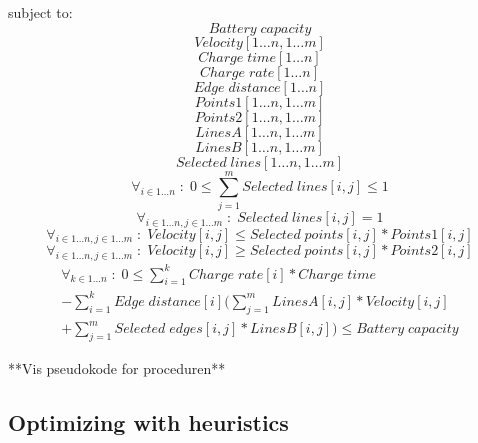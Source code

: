 subject to:
\begin{equation}
Battery\;capacity
\end{equation}
\begin{equation}
Velocity[1 \dots n,1 \dots m]
\end{equation}
\begin{equation}
Charge\;time[1 \dots n]
\end{equation}
\begin{equation}
Charge\;rate[1 \dots n]
\end{equation}
\begin{equation}
Edge\;distance[1 \dots n]
\end{equation}
\begin{equation}
Points1[1 \dots n,1 \dots m]
\end{equation}
\begin{equation}
Points2[1 \dots n,1 \dots m]
\end{equation}
\begin{equation}
LinesA[1 \dots n,1 \dots m]
\end{equation}
\begin{equation}
LinesB[1 \dots n,1 \dots m]
\end{equation}
\begin{equation}
Selected\;lines[1 \dots n,1 \dots m]
\end{equation}
\begin{equation}
\forall_{i\in1 \dots n }\;:\;0\le \sum_{j=1}^{m} Selected\;lines[i,j] \le 1
\end{equation}
\begin{equation}
\forall_{i\in1 \dots n, j \in 1 \dots m} \;:\; Selected\;lines[i,j] = 1
\end{equation}
\begin{equation}
\forall_{i\in1 \dots n, j \in 1 \dots m}\;:\;Velocity[i,j] \le Selected\;points[i,j] * Points1[i,j]
\end{equation}
\begin{equation}
\forall_{i\in1 \dots n, j \in 1 \dots m}\;:\;Velocity[i,j] \ge Selected\;points[i,j] * Points2[i,j]
\end{equation}
\begin{equation}
\begin{split}
\forall_{k\in1 \dots n}\;:\;0 \le\sum_{i=1}^{k}Charge\;rate[i]*Charge\;time\\
-\sum_{i=1}^{k} Edge\; distance[i](\sum_{j=1}^{m} LinesA[i,j]*Velocity[i,j]\\
+\sum_{j=1}^{m} Selected\;edges[i,j]*LinesB[i,j]) \le Battery\;capacity
\end{split}
\end{equation}

**Vis pseudokode for proceduren**

\subsection{Optimizing with heuristics}